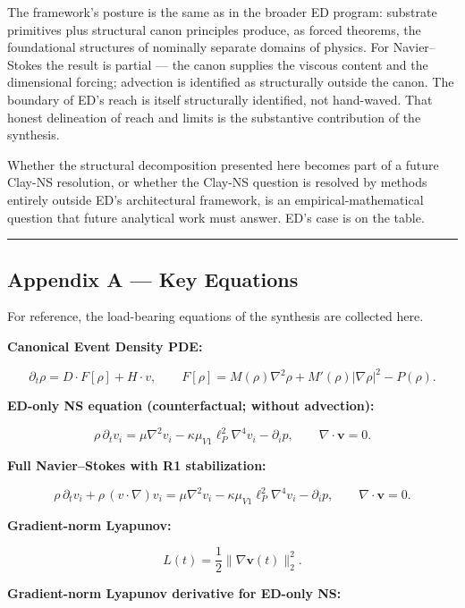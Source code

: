 \documentclass[
]{article}
\begin{document}
The framework's posture is the same as in the broader ED program:
substrate primitives plus structural canon principles produce, as forced
theorems, the foundational structures of nominally separate domains of
physics. For Navier--Stokes the result is partial --- the canon supplies
the viscous content and the dimensional forcing; advection is identified
as structurally outside the canon. The boundary of ED's reach is itself
structurally identified, not hand-waved. That honest delineation of
reach and limits is the substantive contribution of the synthesis.

Whether the structural decomposition presented here becomes part of a
future Clay-NS resolution, or whether the Clay-NS question is resolved
by methods entirely outside ED's architectural framework, is an
empirical-mathematical question that future analytical work must answer.
ED's case is on the table.

\begin{center}\rule{0.5\linewidth}{0.5pt}\end{center}

\subsection{Appendix A --- Key
Equations}\label{appendix-a-key-equations}

For reference, the load-bearing equations of the synthesis are collected
here.

\textbf{Canonical Event Density PDE:}

\[\partial_t \rho = D \cdot F[\rho] + H \cdot v, \qquad F[\rho] = M(\rho)\nabla^2\rho + M'(\rho)|\nabla\rho|^2 - P(\rho).\]

\textbf{ED-only NS equation (counterfactual; without advection):}

\[\rho \, \partial_t v_i = \mu \nabla^2 v_i - \kappa \mu_{V1} \ell_P^2 \nabla^4 v_i - \partial_i p, \qquad \nabla \cdot \mathbf{v} = 0.\]

\textbf{Full Navier--Stokes with R1 stabilization:}

\[\rho \, \partial_t v_i + \rho \, (v \cdot \nabla) v_i = \mu \nabla^2 v_i - \kappa \mu_{V1} \ell_P^2 \nabla^4 v_i - \partial_i p, \qquad \nabla \cdot \mathbf{v} = 0.\]

\textbf{Gradient-norm Lyapunov:}

\[L(t) = \frac{1}{2} \|\nabla \mathbf{v}(t)\|_2^2.\]

\textbf{Gradient-norm Lyapunov derivative for ED-only NS:}
\end{document}
